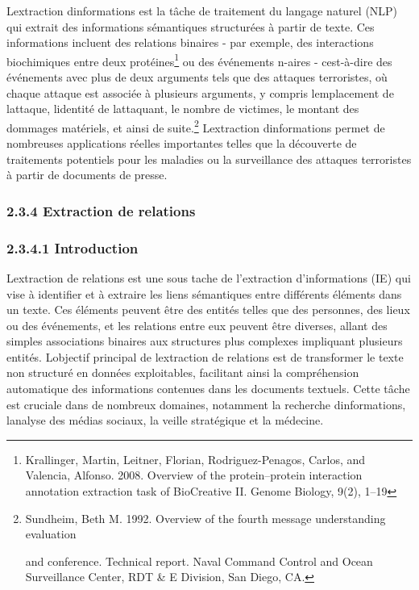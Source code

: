 \documentclass[
]{article}
\begin{document}
L\textquotesingle extraction d\textquotesingle informations est la tâche
de traitement du langage naturel (NLP) qui extrait des informations
sémantiques structurées à partir de texte. Ces informations incluent des
relations binaires - par exemple, des interactions biochimiques entre
deux protéines\footnote{Krallinger, Martin, Leitner, Florian,
  Rodriguez-Penagos, Carlos, and Valencia, Alfonso. 2008. Overview of
  the protein--protein interaction annotation extraction task of
  BioCreative II. Genome Biology, 9(2), 1--19} ou des événements n-aires
- c\textquotesingle est-à-dire des événements avec plus de deux
arguments tels que des attaques terroristes, où chaque attaque est
associée à plusieurs arguments, y compris l\textquotesingle emplacement
de l\textquotesingle attaque, l\textquotesingle identité de
l\textquotesingle attaquant, le nombre de victimes, le montant des
dommages matériels, et ainsi de suite.\footnote{Sundheim, Beth M. 1992.
  Overview of the fourth message understanding evaluation

  and conference. Technical report. Naval Command Control and Ocean
  Surveillance Center, RDT \& E Division, San Diego, CA.}
L\textquotesingle extraction d\textquotesingle informations permet de
nombreuses applications réelles importantes telles que la découverte de
traitements potentiels pour les maladies ou la surveillance des attaques
terroristes à partir de documents de presse.

\subsubsection{2.3.4 Extraction de
relations}\label{extraction-de-relations}

\subsubsection{2.3.4.1 Introduction}\label{introduction-6}

L\textquotesingle extraction de relations est une sous tache de
l'extraction d'informations (IE) qui vise à identifier et à extraire les
liens sémantiques entre différents éléments dans un texte. Ces éléments
peuvent être des entités telles que des personnes, des lieux ou des
événements, et les relations entre eux peuvent être diverses, allant des
simples associations binaires aux structures plus complexes impliquant
plusieurs entités. L\textquotesingle objectif principal de
l\textquotesingle extraction de relations est de transformer le texte
non structuré en données exploitables, facilitant ainsi la compréhension
automatique des informations contenues dans les documents textuels.
Cette tâche est cruciale dans de nombreux domaines, notamment la
recherche d\textquotesingle informations, l\textquotesingle analyse des
médias sociaux, la veille stratégique et la médecine.
\end{document}
